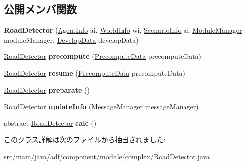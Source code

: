 \subsection*{公開メンバ関数}
\begin{DoxyCompactItemize}
\item 
\hypertarget{classadf_1_1component_1_1module_1_1complex_1_1RoadDetector_a54fe9e9c6e2e3b9cfef54114b000ae66}{}\label{classadf_1_1component_1_1module_1_1complex_1_1RoadDetector_a54fe9e9c6e2e3b9cfef54114b000ae66} 
{\bfseries Road\+Detector} (\hyperlink{classadf_1_1agent_1_1info_1_1AgentInfo}{Agent\+Info} ai, \hyperlink{classadf_1_1agent_1_1info_1_1WorldInfo}{World\+Info} wi, \hyperlink{classadf_1_1agent_1_1info_1_1ScenarioInfo}{Scenario\+Info} si, \hyperlink{classadf_1_1agent_1_1module_1_1ModuleManager}{Module\+Manager} module\+Manager, \hyperlink{classadf_1_1agent_1_1develop_1_1DevelopData}{Develop\+Data} develop\+Data)
\item 
\hypertarget{classadf_1_1component_1_1module_1_1complex_1_1RoadDetector_afb3b34a57a81e1bbc8757d767955c6db}{}\label{classadf_1_1component_1_1module_1_1complex_1_1RoadDetector_afb3b34a57a81e1bbc8757d767955c6db} 
\hyperlink{classadf_1_1component_1_1module_1_1complex_1_1RoadDetector}{Road\+Detector} {\bfseries precompute} (\hyperlink{classadf_1_1agent_1_1precompute_1_1PrecomputeData}{Precompute\+Data} precompute\+Data)
\item 
\hypertarget{classadf_1_1component_1_1module_1_1complex_1_1RoadDetector_ad1146b1b1d106c8b56035e3552a943f4}{}\label{classadf_1_1component_1_1module_1_1complex_1_1RoadDetector_ad1146b1b1d106c8b56035e3552a943f4} 
\hyperlink{classadf_1_1component_1_1module_1_1complex_1_1RoadDetector}{Road\+Detector} {\bfseries resume} (\hyperlink{classadf_1_1agent_1_1precompute_1_1PrecomputeData}{Precompute\+Data} precompute\+Data)
\item 
\hypertarget{classadf_1_1component_1_1module_1_1complex_1_1RoadDetector_ae040aed23ecd46133e637ff6d09f7645}{}\label{classadf_1_1component_1_1module_1_1complex_1_1RoadDetector_ae040aed23ecd46133e637ff6d09f7645} 
\hyperlink{classadf_1_1component_1_1module_1_1complex_1_1RoadDetector}{Road\+Detector} {\bfseries preparate} ()
\item 
\hypertarget{classadf_1_1component_1_1module_1_1complex_1_1RoadDetector_ac15499fc352302ae284a0e5ddcfa1091}{}\label{classadf_1_1component_1_1module_1_1complex_1_1RoadDetector_ac15499fc352302ae284a0e5ddcfa1091} 
\hyperlink{classadf_1_1component_1_1module_1_1complex_1_1RoadDetector}{Road\+Detector} {\bfseries update\+Info} (\hyperlink{classadf_1_1agent_1_1communication_1_1MessageManager}{Message\+Manager} message\+Manager)
\item 
\hypertarget{classadf_1_1component_1_1module_1_1complex_1_1RoadDetector_ad572725af764bbffb9c48215f119ecf4}{}\label{classadf_1_1component_1_1module_1_1complex_1_1RoadDetector_ad572725af764bbffb9c48215f119ecf4} 
abstract \hyperlink{classadf_1_1component_1_1module_1_1complex_1_1RoadDetector}{Road\+Detector} {\bfseries calc} ()
\end{DoxyCompactItemize}


このクラス詳解は次のファイルから抽出されました\+:\begin{DoxyCompactItemize}
\item 
src/main/java/adf/component/module/complex/Road\+Detector.\+java\end{DoxyCompactItemize}
